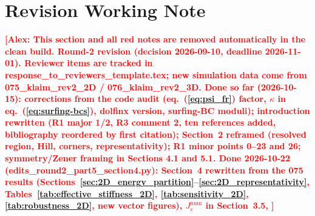 \documentclass[pdflatex,sn-mathphys-num]{sn-jnl}%
\newcommand{\mycomment}[2]{\textbf{\textcolor{red}{[#1: #2]}}}
\theoremstyle{thmstyleone}%
\theoremstyle{thmstyletwo}%
\theoremstyle{thmstylethree}%
\begin{document}
\section*{Revision Working Note}
\mycomment{Alex}{This section and all red notes are removed automatically in the clean build. Round-2 revision
(decision 2026-09-10, deadline 2026-11-01). Reviewer items are tracked in response\_to\_reviewers\_template.tex;
new simulation data come from 075\_klaim\_rev2\_2D / 076\_klaim\_rev2\_3D. Done so far (2026-10-15): corrections from the code
audit (eq.~(\ref{eq:psi_fr}) factor, $\kappa$ in eq.~(\ref{eq:surfing-bcs}), dolfinx version, surfing-BC moduli); introduction
rewritten (R1 major 1/2, R3 comment 2, ten references added, bibliography reordered by first citation); Section~2 reframed
(resolved region, Hill, corners, representativity); R1 minor points 0--23 and 26; symmetry/Zener framing in Sections 4.1 and 5.1.
Done 2026-10-22 (edits\_round2\_part5\_section4.py): Section~4 rewritten from the 075 results (Sections~\ref{sec:2D_energy_partition}--\ref{sec:2D_representativity},
Tables~\ref{tab:effective_stiffness_2D}, \ref{tab:sensitivity_2D}, \ref{tab:robustness_2D}, new vector figures), $J_c^{\text{num}}$ in Section~3.5,
}
\end{document}
